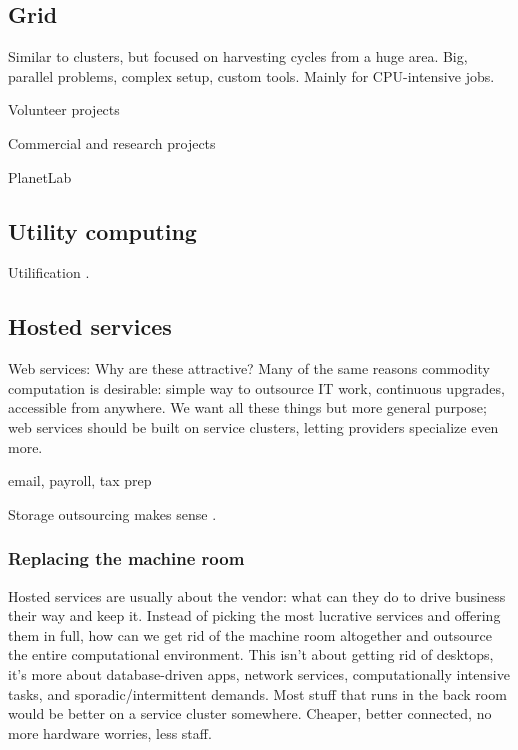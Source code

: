 \subsection{Grid}

Similar to clusters, but focused on harvesting cycles from a huge area. Big, parallel problems, complex setup, custom tools. Mainly for CPU-intensive jobs.

Volunteer projects

Commercial and research projects

PlanetLab

\cite{foster}
\cite{figueiredo03}

\cite{zhao04}

\subsection{Utility computing}

Utilification \cite{wilkes04}.

\subsection{Hosted services}

Web services: Why are these attractive? Many of the same reasons commodity computation is desirable: simple way to outsource IT work, continuous upgrades, accessible from anywhere. We want all these things but more general purpose; web services should be built on service clusters, letting providers specialize even more.

email, payroll, tax prep

Storage outsourcing makes sense \cite{ng}.

\subsubsection{Replacing the machine room}

Hosted services are usually about the vendor: what can they do to drive business their way and keep it. Instead of picking the most lucrative services and offering them in full, how can we get rid of the machine room altogether and outsource the entire computational environment. This isn't about getting rid of desktops, it's more about database-driven apps, network services, computationally intensive tasks, and sporadic/intermittent demands. Most stuff that runs in the back room would be better on a service cluster somewhere. Cheaper, better connected, no more hardware worries, less staff.

